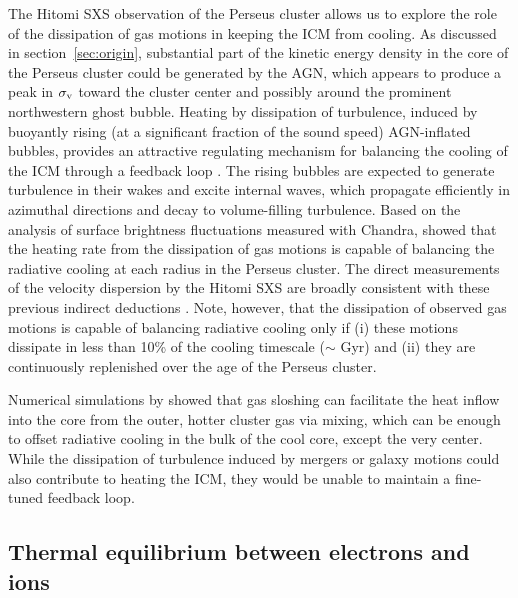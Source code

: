 The Hitomi SXS observation of the Perseus cluster allows us to explore the role of the dissipation of gas motions in keeping the ICM from cooling. As discussed in section~\ref{sec:origin}, substantial part of the kinetic energy density in the core of the Perseus cluster could be generated by the AGN, which appears to produce a peak in $\sigma_{\rm v}$ toward the cluster center and possibly around the prominent northwestern ghost bubble. Heating by dissipation of turbulence, induced by buoyantly rising (at a significant fraction of the sound speed) AGN-inflated bubbles, provides an attractive regulating mechanism for balancing the cooling of the ICM through a feedback loop \citep[e.g][]{McNamara07}. The rising bubbles are expected to generate turbulence in their wakes and excite internal waves, which propagate efficiently in azimuthal directions and decay to volume-filling turbulence. Based on the analysis of surface brightness fluctuations measured with Chandra, \citet{Zhuravleva14} showed that the heating rate from the dissipation of gas motions is capable of balancing the radiative cooling at each radius in the Perseus cluster. The direct measurements of the velocity dispersion by the Hitomi SXS are broadly consistent with these previous indirect deductions \citep[see figure~11 in][which compares the Chandra results with the earlier measurements reported by H16]{zhuravleva2017}. Note, however, that the dissipation of observed gas motions is capable of balancing radiative cooling only if (i) these motions dissipate in less than 10\% of the cooling timescale ($\sim$ Gyr) and (ii) they are continuously replenished over the age of the Perseus cluster.

Numerical simulations by \citet{ZuHone2010} showed that gas sloshing can facilitate the heat inflow into the core from the outer, hotter cluster gas via mixing, which can be enough to offset radiative cooling in the bulk of the cool core, except the very center. While the dissipation of turbulence induced by mergers \citep{Fujita04} or galaxy motions \citep{balbus1990,Gu13} could also contribute to heating the ICM, they would be unable to maintain a fine-tuned feedback loop.

\subsection{Thermal equilibrium between electrons and ions}

